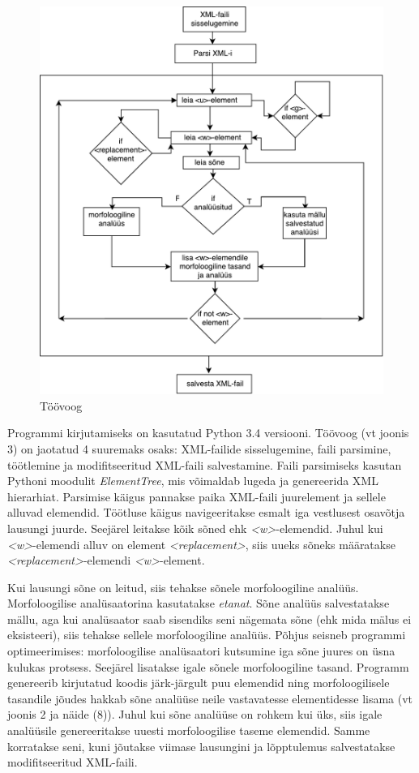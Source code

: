 \documentclass[12pt]{article}
\begin{document}
\begin{figure}[H]
    \centering
    \includegraphics[width=12cm]{toovoog}
    \caption{Töövoog}
\end{figure}


Programmi kirjutamiseks on kasutatud Python 3.4 versiooni. Töövoog (vt joonis 3) on jaotatud 4 suuremaks osaks: XML-failide sisselugemine, faili parsimine, töötlemine ja modifitseeritud XML-faili salvestamine. Faili parsimiseks kasutan Pythoni moodulit \emph{ElementTree}, mis võimaldab lugeda ja genereerida XML hierarhiat. Parsimise käigus pannakse paika XML-faili juurelement ja sellele alluvad elemendid. Töötluse käigus navigeeritakse esmalt iga vestlusest osavõtja lausungi juurde. Seejärel leitakse kõik sõned ehk \emph{<w>}-elemendid. Juhul kui \emph{<w>}-elemendi alluv on element \emph{<replacement>}, siis uueks sõneks määratakse \emph{<replacement>}-elemendi \emph{<w>}-element.

Kui lausungi sõne on leitud, siis tehakse sõnele morfoloogiline analüüs. Morfoloogilise analüsaatorina kasutatakse \emph{etanat}. Sõne analüüs salvestatakse mällu, aga kui analüsaator saab sisendiks seni nägemata sõne (ehk mida mälus ei eksisteeri), siis tehakse sellele morfoloogiline analüüs. Põhjus seisneb programmi optimeerimises: morfoloogilise analüsaatori kutsumine iga sõne juures on üsna kulukas protsess. Seejärel lisatakse igale sõnele morfoloogiline tasand. Programm genereerib kirjutatud koodis järk-järgult puu elemendid ning morfoloogilisele tasandile jõudes hakkab sõne analüüse neile vastavatesse elementidesse lisama (vt joonis 2 ja näide (8)). Juhul kui sõne analüüse on rohkem kui üks, siis igale analüüsile genereeritakse uuesti morfoloogilise taseme elemendid. Samme korratakse seni, kuni jõutakse viimase lausungini ja lõpptulemus salvestatakse modifitseeritud XML-faili.
\end{document}
